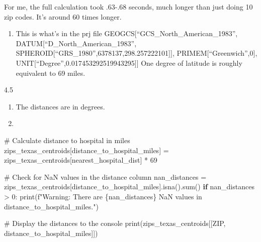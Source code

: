 \documentclass[
  letterpaper,
  DIV=11,
  numbers=noendperiod]{scrartcl}
\newenvironment{Shaded}{\begin{snugshade}}{\end{snugshade}}
\newcommand{\BuiltInTok}[1]{\textcolor[rgb]{0.00,0.23,0.31}{#1}}
\newcommand{\CommentTok}[1]{\textcolor[rgb]{0.37,0.37,0.37}{#1}}
\newcommand{\ControlFlowTok}[1]{\textcolor[rgb]{0.00,0.23,0.31}{\textbf{#1}}}
\newcommand{\DecValTok}[1]{\textcolor[rgb]{0.68,0.00,0.00}{#1}}
\newcommand{\NormalTok}[1]{\textcolor[rgb]{0.00,0.23,0.31}{#1}}
\newcommand{\OperatorTok}[1]{\textcolor[rgb]{0.37,0.37,0.37}{#1}}
\newcommand{\SpecialCharTok}[1]{\textcolor[rgb]{0.37,0.37,0.37}{#1}}
\newcommand{\SpecialStringTok}[1]{\textcolor[rgb]{0.13,0.47,0.30}{#1}}
\newcommand{\StringTok}[1]{\textcolor[rgb]{0.13,0.47,0.30}{#1}}
\providecommand{\tightlist}{%
  \setlength{\itemsep}{0pt}\setlength{\parskip}{0pt}}\usepackage{longtable,booktabs,array}
\begin{document}
For me, the full calculation took .63-.68 seconds, much longer than just
doing 10 zip codes. It's around 60 times longer.

\begin{enumerate}
\def\labelenumi{\alph{enumi}.}
\setcounter{enumi}{2}
\tightlist
\item
  This is what's in the prj file
  GEOGCS{[}``GCS\_North\_American\_1983'',
  DATUM{[}``D\_North\_American\_1983'',
  SPHEROID{[}``GRS\_1980'',6378137,298.257222101{]}{]},
  PRIMEM{[}``Greenwich'',0{]},
  UNIT{[}``Degree'',0.017453292519943295{]}{]} One degree of latitude is
  roughly equivalent to 69 miles.
\end{enumerate}

4.5

\begin{enumerate}
\def\labelenumi{\alph{enumi}.}
\item
  The distances are in degrees.
\item
\end{enumerate}

\begin{Shaded}
\begin{Highlighting}[]
\CommentTok{\# Calculate distance to hospital in miles}
\NormalTok{zips\_texas\_centroids[}\StringTok{\textquotesingle{}distance\_to\_hospital\_miles\textquotesingle{}}\NormalTok{] }\OperatorTok{=}\NormalTok{ zips\_texas\_centroids[}\StringTok{\textquotesingle{}nearest\_hospital\_dist\textquotesingle{}}\NormalTok{] }\OperatorTok{*} \DecValTok{69}

\CommentTok{\# Check for NaN values in the distance column}
\NormalTok{nan\_distances }\OperatorTok{=}\NormalTok{ zips\_texas\_centroids[}\StringTok{\textquotesingle{}distance\_to\_hospital\_miles\textquotesingle{}}\NormalTok{].isna().}\BuiltInTok{sum}\NormalTok{()}
\ControlFlowTok{if}\NormalTok{ nan\_distances }\OperatorTok{\textgreater{}} \DecValTok{0}\NormalTok{:}
    \BuiltInTok{print}\NormalTok{(}\SpecialStringTok{f"Warning: There are }\SpecialCharTok{\{}\NormalTok{nan\_distances}\SpecialCharTok{\}}\SpecialStringTok{ NaN values in \textquotesingle{}distance\_to\_hospital\_miles\textquotesingle{}."}\NormalTok{)}

\CommentTok{\# Display the distances to the console}
\BuiltInTok{print}\NormalTok{(zips\_texas\_centroids[[}\StringTok{\textquotesingle{}ZIP\textquotesingle{}}\NormalTok{, }\StringTok{\textquotesingle{}distance\_to\_hospital\_miles\textquotesingle{}}\NormalTok{]])}
\end{Highlighting}
\end{Shaded}
\end{document}
